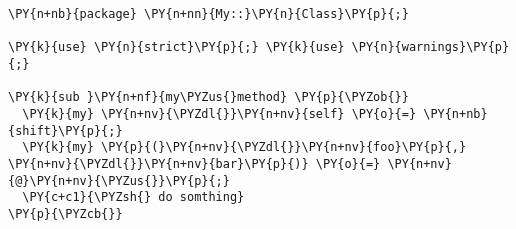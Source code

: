 \begin{Verbatim}[commandchars=\\\{\}]
\PY{n+nb}{package} \PY{n+nn}{My::}\PY{n}{Class}\PY{p}{;}

\PY{k}{use} \PY{n}{strict}\PY{p}{;} \PY{k}{use} \PY{n}{warnings}\PY{p}{;}

\PY{k}{sub }\PY{n+nf}{my\PYZus{}method} \PY{p}{\PYZob{}}
  \PY{k}{my} \PY{n+nv}{\PYZdl{}}\PY{n+nv}{self} \PY{o}{=} \PY{n+nb}{shift}\PY{p}{;}
  \PY{k}{my} \PY{p}{(}\PY{n+nv}{\PYZdl{}}\PY{n+nv}{foo}\PY{p}{,} \PY{n+nv}{\PYZdl{}}\PY{n+nv}{bar}\PY{p}{)} \PY{o}{=} \PY{n+nv}{@}\PY{n+nv}{\PYZus{}}\PY{p}{;}
  \PY{c+c1}{\PYZsh{} do somthing}
\PY{p}{\PYZcb{}}
\end{Verbatim}
